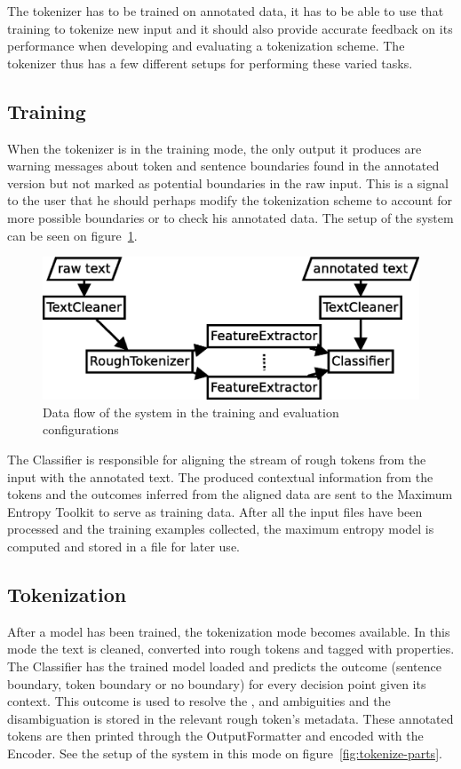 The tokenizer has to be trained on annotated data, it has to be able to use
that training to tokenize new input and it should also provide accurate
feedback on its performance when developing and evaluating a tokenization
scheme. The tokenizer thus has a few different setups for performing these
varied tasks.

\subsection{Training}

When the tokenizer is in the training mode, the only output it produces are
warning messages about token and sentence boundaries found in the annotated
version but not marked as potential boundaries in the raw input. This is a
signal to the user that he should perhaps modify the tokenization scheme to
account for more possible boundaries or to check his annotated data. The setup
of the system can be seen on figure~\ref{fig:train-parts}.

\begin{figure}
  \includegraphics[width=\textwidth]{img/train-parts.eps}
  \caption{Data flow of the system in the training and evaluation
           configurations}
  \label{fig:train-parts}
\end{figure}

The Classifier is responsible for aligning the stream of rough tokens from the
input with the annotated text. The produced contextual information from the
tokens and the outcomes inferred from the aligned data are sent to the Maximum
Entropy Toolkit to serve as training data. After all the input files have been
processed and the training examples collected, the maximum entropy model is
computed and stored in a file for later use.

\subsection{Tokenization}

After a model has been trained, the tokenization mode becomes available. In
this mode the text is cleaned, converted into rough tokens and tagged with
properties. The Classifier has the trained model loaded and predicts the
outcome (sentence boundary, token boundary or no boundary) for every decision
point given its context. This outcome is used to resolve the \maysplit{},
\mayjoin{} and \maybreaksentence{} ambiguities and the disambiguation is stored
in the relevant rough token's metadata. These annotated tokens are then printed
through the OutputFormatter and encoded with the Encoder. See the setup of the
system in this mode on figure~\ref{fig:tokenize-parts}.

